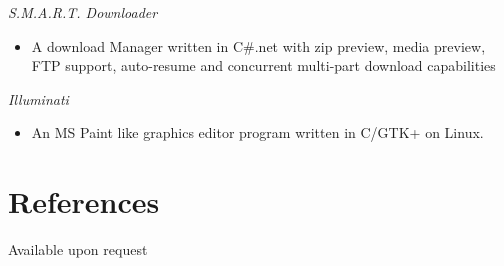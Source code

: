 \documentclass[a4paper,margin,line]{resume}
\begin{document}
\begin{resume}
\textsl{S.M.A.R.T. Downloader}
\begin{itemize}
	\item A download Manager written in C\#.net with zip preview, media preview, FTP support, auto-resume and concurrent multi-part download capabilities
\end{itemize}

\textsl{Illuminati}
\begin{itemize}
	\item An MS Paint like graphics editor program written in C/GTK+ on Linux.
\end{itemize}


\section{\mysidestyle References} 

Available upon request


\end{resume}
\end{document}
